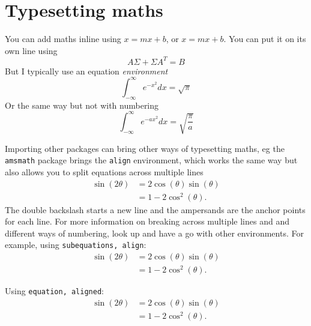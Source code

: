 \documentclass{article} %
\begin{document}
\endgroup




\section{Typesetting maths}

You can add maths inline using $x=mx + b$, or \(x=mx+b\). You can put it on its own line using 
\[
    A\Sigma + \Sigma A^T = B
\]
But I typically use an equation \textit{environment}
\begin{equation}
    \int_{-\infty}^\infty e^{-x^2} d x = \sqrt{\pi}
\end{equation}
Or the same way but not with numbering
\begin{equation*}
    \int_{-\infty}^\infty e^{-ax^2} d x = \sqrt{\frac{\pi}{a}}
\end{equation*}

Importing other packages can bring other ways of typesetting maths, eg the \texttt{amsmath} package brings the \texttt{align} environment, which works the same way but also allows you to split equations across multiple lines
\begin{align}
    \sin(2\theta) & = 2\cos(\theta)\sin(\theta) \\
    & = 1-2\cos^2(\theta).
\end{align}
The double backslash starts a new line and the ampersands are the anchor points for each line.
For more information on breaking across multiple lines and and different ways of numbering, look up and have a go with other environments.
For example, using \texttt{subequations, align}:
\begin{subequations} %
\begin{align} %
    \sin(2\theta) & = 2\cos(\theta)\sin(\theta) \\
    & = 1-2\cos^2(\theta).
\end{align}
\end{subequations}

Using \texttt{equation, aligned}:
\begin{equation} %
\begin{aligned} %
    \sin(2\theta) & = 2\cos(\theta)\sin(\theta) \\
    & = 1-2\cos^2(\theta).
\end{aligned}
\end{equation}
\end{document}

